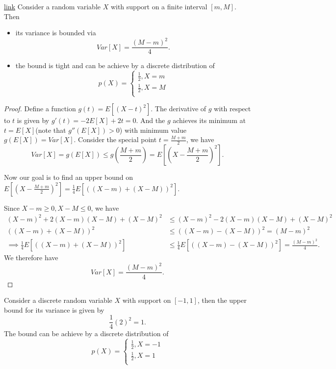 \begin{refsection}
\begin{lemma}\href{https://stats.stackexchange.com/questions/45588/variance-of-a-bounded-random-variable}{link}\label{ch:theory-of-probability:th:PopoviciuUpperBoundForVariance}
Consider a random variable $X$ with support on a finite interval $[m,M]$. Then 
\begin{itemize}
	\item its variance is bounded via 
	$$Var[X] = \frac{(M-m)^2}{4}.$$
	\item the bound is tight and can be achieve by a discrete distribution of 
	$$p(X) = \begin{cases*}
	\frac{1}{2}, X = m\\
	\frac{1}{2}, X = M\\
	\end{cases*}$$
\end{itemize}	
\end{lemma}
\begin{proof}
Define a function $g(t) = E[(X-t)^2]$.
The derivative of $g$ with respect to $t$ is given by $g'(t) = -2E[X] + 2t = 0$. And the $g$ achieves its minimum at $t = E[X]$(note that $g''(E[X]) > 0$) with minimum value $g(E[X]) = Var[X]$.
Consider the special point $t = \frac{M+m}{2}$, we have
$$Var[X] = g(E[X]) \leq g(\frac{M+m}{2}) = E[(X - \frac{M+m}{2})^2].$$

Now our goal is to find an upper bound on $E[(X - \frac{M+m}{2})^2] =\frac{1}{4} E[((X - m) + (X -M))^2]$. 

Since $X-m\geq 0, X-M\leq 0$, we have
\begin{align*}
(X-m)^2 + 2(X-m)(X-M) + (X-M)^2 &\leq (X-m)^2 - 2(X-m)(X-M) + (X-M)^2 \\
((X-m) + (X-M))^2 &\leq ((X-m) - (X-M))^2 = (M-m)^2 \\
\implies \frac{1}{4}E[((X - m) + (X -M))^2] &\leq \frac{1}{4}E[((X - m) - (X -M))^2] = \frac{(M-m)^2}{4}.
\end{align*}
We therefore have 
$$Var[X] = \frac{(M-m)^2}{4}.$$	
\end{proof}

\begin{example}
Consider a discrete random variable $X$ with support on $[-1,1]$, then the upper bound for its variance is given by $$\frac{1}{4}(2)^2 = 1.$$ 	
The bound  can be achieve by a discrete distribution of 
$$p(X) = \begin{cases*}
\frac{1}{2}, X = -1\\
\frac{1}{2}, X = 1\\
\end{cases*}$$
\end{example}




\end{refsection}
